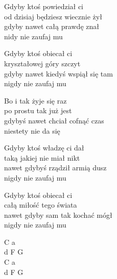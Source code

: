 \begin{text}
    Gdyby ktoś powiedział ci\\
    od dzisiaj będziesz wiecznie żył\\
    gdyby nawet całą prawdę znał\\
    nidy nie zaufaj mu

    Gdyby ktoś obiecał ci\\
    kryształowej góry szczyt\\
    gdyby nawet kiedyś wspiął się tam\\
    nigdy nie zaufaj mu

    \vin Bo i tak żyje się raz\\
    \vin po prostu tak już jest\\
    \vin gdybyś nawet chciał cofnąć czas\\
    \vin niestety nie da się

    Gdyby ktoś władzę ci dał\\
    taką jakiej nie miał nikt\\
    nawet gdybyś rządził armią dusz\\
    nigdy nie zaufaj mu

    Gdyby ktoś obiecał ci\\
    całą miłość tego świata\\
    nawet gdyby sam tak kochać mógł\\
    nigdy nie zaufaj mu
\end{text}
\begin{chord}
    C a\\
    d F G\\
    C a\\
    d F G
\end{chord}